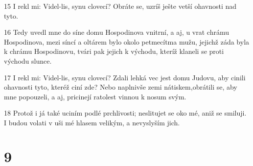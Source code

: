 \par 15 I rekl mi: Videl-lis, synu clovecí? Obráte se, uzríš ješte vetší ohavnosti nad tyto.
\par 16 Tedy uvedl mne do síne domu Hospodinova vnitrní, a aj, u vrat chrámu Hospodinova, mezi síncí a oltárem bylo okolo petmecítma mužu, jejichž záda byla k chrámu Hospodinovu, tvári pak jejich k východu, kteríž klaneli se proti východu slunce.
\par 17 I rekl mi: Videl-lis, synu clovecí? Zdali lehká vec jest domu Judovu, aby cinili ohavnosti tyto, kteréž ciní zde? Nebo naplnivše zemi nátiskem,obrátili se, aby mne popouzeli, a aj, pricinejí ratolest vinnou k nosum svým.
\par 18 Protož i já také uciním podlé prchlivosti; neslitujet se oko mé, aniž se smiluji. I budou volati v uši mé hlasem velikým, a nevyslyším jich.

\chapter{9}

